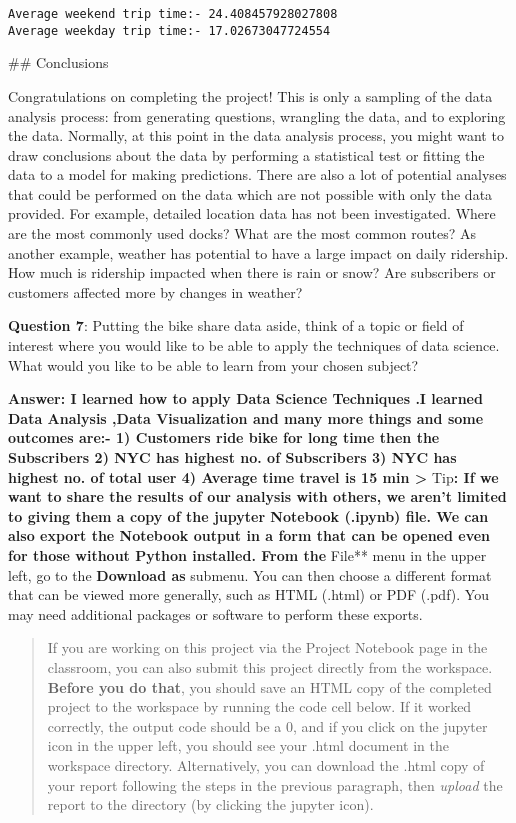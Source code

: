 \documentclass[11pt]{article}
\begin{document}
    \begin{Verbatim}[commandchars=\\\{\}]
Average weekend trip time:- 24.408457928027808
Average weekday trip time:- 17.02673047724554

    \end{Verbatim}

     \#\# Conclusions

Congratulations on completing the project! This is only a sampling of
the data analysis process: from generating questions, wrangling the
data, and to exploring the data. Normally, at this point in the data
analysis process, you might want to draw conclusions about the data by
performing a statistical test or fitting the data to a model for making
predictions. There are also a lot of potential analyses that could be
performed on the data which are not possible with only the data
provided. For example, detailed location data has not been investigated.
Where are the most commonly used docks? What are the most common routes?
As another example, weather has potential to have a large impact on
daily ridership. How much is ridership impacted when there is rain or
snow? Are subscribers or customers affected more by changes in weather?

\textbf{Question 7}: Putting the bike share data aside, think of a topic
or field of interest where you would like to be able to apply the
techniques of data science. What would you like to be able to learn from
your chosen subject?

\textbf{Answer: I learned how to apply Data Science Techniques .I
learned Data Analysis ,Data Visualization and many more things and some
outcomes are:- 1) Customers ride bike for long time then the Subscribers
2) NYC has highest no. of Subscribers 3) NYC has highest no. of total
user 4) Average time travel is 15 min \textgreater{} }Tip\textbf{: If we
want to share the results of our analysis with others, we aren't limited
to giving them a copy of the jupyter Notebook (.ipynb) file. We can also
export the Notebook output in a form that can be opened even for those
without Python installed. From the }File** menu in the upper left, go to
the \textbf{Download as} submenu. You can then choose a different format
that can be viewed more generally, such as HTML (.html) or PDF (.pdf).
You may need additional packages or software to perform these exports.

\begin{quote}
If you are working on this project via the Project Notebook page in the
classroom, you can also submit this project directly from the workspace.
\textbf{Before you do that}, you should save an HTML copy of the
completed project to the workspace by running the code cell below. If it
worked correctly, the output code should be a 0, and if you click on the
jupyter icon in the upper left, you should see your .html document in
the workspace directory. Alternatively, you can download the .html copy
of your report following the steps in the previous paragraph, then
\emph{upload} the report to the directory (by clicking the jupyter
icon).
\end{quote}
\end{document}
